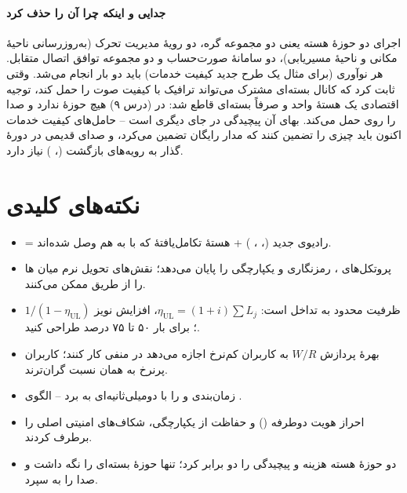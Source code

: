 \documentclass[11pt,a4paper]{article}
\begin{document}
\paragraph{جدایی  و اینکه چرا  آن را حذف کرد} اجرای دو حوزهٔ هسته یعنی دو مجموعه
گره، دو رویهٔ مدیریت تحرک (به‌روزرسانی ناحیهٔ مکانی و ناحیهٔ مسیریابی)، دو سامانهٔ صورت‌حساب و دو
مجموعه توافق اتصال متقابل. هر نوآوری (برای مثال یک طرح جدید کیفیت خدمات) باید دو بار انجام می‌شد.
وقتی  ثابت کرد که کانال بسته‌ای مشترک می‌تواند ترافیک با کیفیت صوت را حمل کند، توجیه
اقتصادی یک هستهٔ واحد و صرفاً بسته‌ای قاطع شد:  در  (درس ۹) هیچ حوزهٔ 
ندارد و صدا را  روی  حمل می‌کند. بهای آن پیچیدگی در جای دیگری است -- حامل‌های
کیفیت خدمات اکنون باید چیزی را تضمین کنند که مدار رایگان تضمین می‌کرد، و صدای قدیمی در دورهٔ گذار
به رویه‌های بازگشت (، ) نیاز دارد.

\section{نکته‌های کلیدی}
\begin{takeawaybox}
\begin{itemize}
  \item {} = رادیوی جدید (، ، ) + هستهٔ تکامل‌یافتهٔ
         که با  به هم وصل شده‌اند.
  \item {} پروتکل‌های ، رمزنگاری و یکپارچگی را پایان می‌دهد؛ نقش‌های
         تحویل نرم میان ها را از طریق  ممکن می‌کنند.
  \item ظرفیت  محدود به تداخل است: $\eta_{\mathrm{UL}} = (1+i)\sum L_j$، افزایش نویز
        $1/(1-\eta_{\mathrm{UL}})$؛ برای بار ۵۰ تا ۷۵ درصد طراحی کنید.
  \item بهرهٔ پردازش $W/R$ به کاربران کم‌نرخ اجازه می‌دهد در  منفی کار کنند؛ کاربران
        پرنرخ به همان نسبت گران‌ترند.
  \item {} زمان‌بندی و  را با  دومیلی‌ثانیه‌ای به  برد -- الگوی
        .
  \item احراز هویت دوطرفه () و حفاظت از یکپارچگی، شکاف‌های امنیتی اصلی  را برطرف کردند.
  \item دو حوزهٔ هسته هزینه و پیچیدگی را دو برابر کرد؛  تنها حوزهٔ بسته‌ای را نگه داشت و
        صدا را به  سپرد.
\end{itemize}
\end{takeawaybox}
\end{document}
